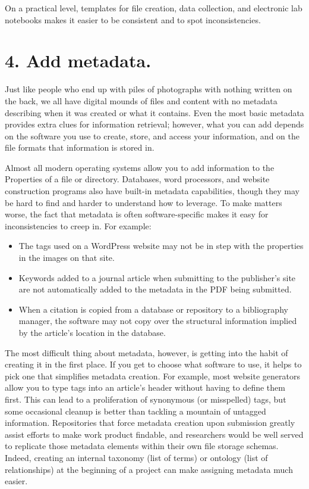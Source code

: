 \documentclass[10pt,letterpaper]{article}
\newcommand{\rulemajor}[1]{\section*{#1}}
\begin{document}
On a practical level, templates for file creation, data collection, and electronic 
lab notebooks makes it easier to be consistent and to spot inconsistencies.

\rulemajor{4. Add metadata.}

Just like people who end up with piles of photographs with nothing written on
the back, we all have digital mounds of files and content with no metadata
describing when it was created or what it contains. Even the most basic
metadata provides extra clues for information retrieval; however, what you can
add depends on the software you use to create, store, and access your
information, and on the file formats that information is stored in.

Almost all modern operating systems allow you to add information to the
Properties of a file or directory. Databases, word processors, and website
construction programs also have built-in metadata capabilities, though they may
be hard to find and harder to understand how to leverage. To make matters
worse, the fact that metadata is often software-specific makes it easy for
inconsistencies to creep in. For example:

\begin{itemize}

\item
  The tags used on a WordPress website may not be in step with the properties in
  the images on that site.

\item
  Keywords added to a journal article when submitting to the publisher's site
  are not automatically added to the metadata in the PDF being submitted.

\item
  When a citation is copied from a database or repository to a bibliography
  manager, the software may not copy over the structural information implied by
  the article's location in the database.

\end{itemize}

The most difficult thing about metadata, however, is getting into the habit of
creating it in the first place. If you get to choose what software to use, it
helps to pick one that simplifies metadata creation. For example, most website
generators allow you to type tags into an article's header without having to
define them first. This can lead to a proliferation of synonymous (or
misspelled) tags, but some occasional cleanup is better than tackling a mountain
of untagged information. Repositories that force metadata creation upon
submission greatly assist efforts to make work product findable, and researchers
would be well served to replicate those metadata elements within their own file
storage schemas. Indeed, creating an internal taxonomy (list of terms) or
ontology (list of relationships) at the beginning of a project can make
assigning metadata much easier.
\end{document}
